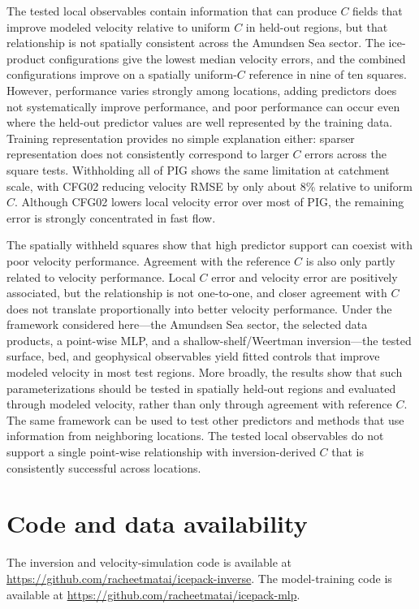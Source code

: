 \documentclass[review,jog]{igs}
\begin{document}
The tested local observables contain information that can produce $C$ fields that improve modeled velocity relative to uniform $C$ in held-out regions, but that relationship is not spatially consistent across the Amundsen Sea sector. The ice-product configurations give the lowest median velocity errors, and the combined configurations improve on a spatially uniform-$C$ reference in nine of ten squares. However, performance varies strongly among locations, adding predictors does not systematically improve performance, and poor performance can occur even where the held-out predictor values are well represented by the training data. Training representation provides no simple explanation either: sparser representation does not consistently correspond to larger $C$ errors across the square tests. Withholding all of PIG shows the same limitation at catchment scale, with CFG02 reducing velocity RMSE by only about 8\% relative to uniform $C$. Although CFG02 lowers local velocity error over most of PIG, the remaining error is strongly concentrated in fast flow.

The spatially withheld squares show that high predictor support can coexist
with poor velocity performance. Agreement with the reference $C$ is also only
partly related to velocity performance. Local $C$ error and velocity error are
positively associated, but the relationship is not one-to-one, and closer
agreement with $C$ does not translate proportionally into better velocity
performance. Under the framework considered here---the Amundsen Sea sector, the selected data products, a point-wise MLP, and a shallow-shelf/Weertman inversion---the tested surface, bed, and geophysical observables yield fitted controls that improve modeled velocity in most test regions. More broadly, the results show that such parameterizations should be tested in spatially held-out regions and evaluated through modeled velocity, rather than only through agreement with reference $C$. The same framework can be used to
test other predictors and methods that use information from neighboring
locations. The tested local observables do not support a single point-wise
relationship with inversion-derived $C$ that is consistently successful
across locations.


\section*{Code and data availability}
\begin{sloppypar}
The inversion and velocity-simulation code is available at \url{https://github.com/racheetmatai/icepack-inverse}. The model-training code is available at \url{https://github.com/racheetmatai/icepack-mlp}.
\end{sloppypar}
\end{document}

